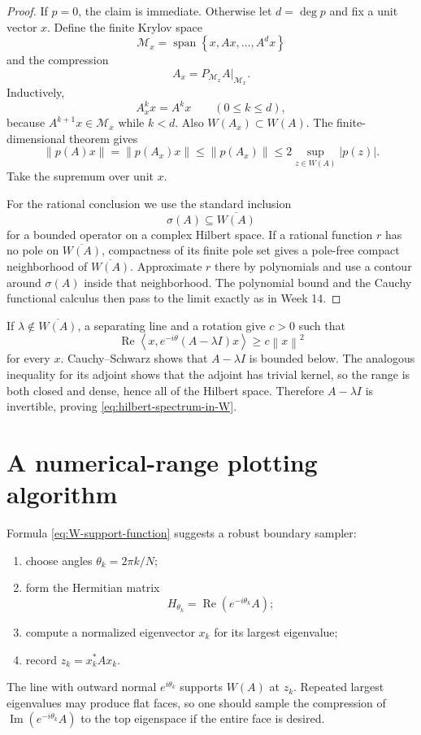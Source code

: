 \documentclass[11pt,oneside,openany]{book}
\theoremstyle{definition}
\theoremstyle{remark}
\newcommand{\RePart}{\operatorname{Re}}
\newcommand{\ImPart}{\operatorname{Im}}
\newcommand{\spec}{\sigma}
\newcommand{\Span}{\operatorname{span}}
\newcommand{\ip}[2]{\left\langle #1,#2\right\rangle}
\newcommand{\norm}[1]{\left\lVert #1\right\rVert}
\newcommand{\set}[1]{\left\{#1\right\}}
\begin{document}
\begin{proof}
If \(p=0\), the claim is immediate.  Otherwise let \(d=\deg p\) and
fix a unit vector \(x\).  Define the finite
Krylov space
\[
  \mathcal M_x=\Span\set{x,Ax,\ldots,A^dx}
\]
and the compression
\[
  A_x=P_{\mathcal M_x}A|_{\mathcal M_x}.
\]
Inductively,
\begin{equation}
  A_x^kx=A^kx
  \qquad(0\leq k\leq d),
  \label{eq:krylov-agreement}
\end{equation}
because \(A^{k+1}x\in\mathcal M_x\) while \(k<d\).
Also \(W(A_x)\subset W(A)\).  The finite-dimensional theorem gives
\[
  \norm{p(A)x}
  =\norm{p(A_x)x}
  \leq\norm{p(A_x)}
  \leq2\sup_{z\in W(A)}|p(z)|.
\]
Take the supremum over unit \(x\).

For the rational conclusion we use the standard inclusion
\begin{equation}
  \spec(A)\subseteq\overline{W(A)}
  \label{eq:hilbert-spectrum-in-W}
\end{equation}
for a bounded operator on a complex Hilbert space.  If a rational
function \(r\) has no pole on \(\overline{W(A)}\), compactness of its
finite pole set gives a pole-free compact neighborhood of
\(\overline{W(A)}\).  Approximate \(r\) there by polynomials and use a
contour around \(\spec(A)\) inside that neighborhood.  The polynomial
bound and the Cauchy functional calculus then pass to the limit exactly
as in Week 14.
\end{proof}

\begin{blackbox}
If \(\lambda\notin\overline{W(A)}\), a separating line and a rotation
give \(c>0\) such that
\[
  \RePart\ip{x}{e^{-i\theta}(A-\lambda I)x}\geq c\norm{x}^2
\]
for every \(x\).  Cauchy--Schwarz shows that \(A-\lambda I\) is bounded
below.  The analogous inequality for its adjoint shows that the
adjoint has trivial kernel, so the range is both closed and dense,
hence all of the Hilbert space.  Therefore \(A-\lambda I\) is
invertible, proving \eqref{eq:hilbert-spectrum-in-W}.
\end{blackbox}

\section{A numerical-range plotting algorithm}

Formula \eqref{eq:W-support-function} suggests a robust boundary
sampler:
\begin{enumerate}
  \item choose angles \(\theta_k=2\pi k/N\);
  \item form the Hermitian matrix
  \[
    H_{\theta_k}=\RePart(e^{-i\theta_k}A);
  \]
  \item compute a normalized eigenvector \(x_k\) for its largest
  eigenvalue;
  \item record \(z_k=x_k^*Ax_k\).
\end{enumerate}
The line with outward normal \(e^{i\theta_k}\) supports \(W(A)\) at
\(z_k\).  Repeated largest eigenvalues may produce flat faces, so one
should sample the compression of
\(\ImPart(e^{-i\theta_k}A)\) to the top eigenspace if the entire face
is desired.
\end{document}
